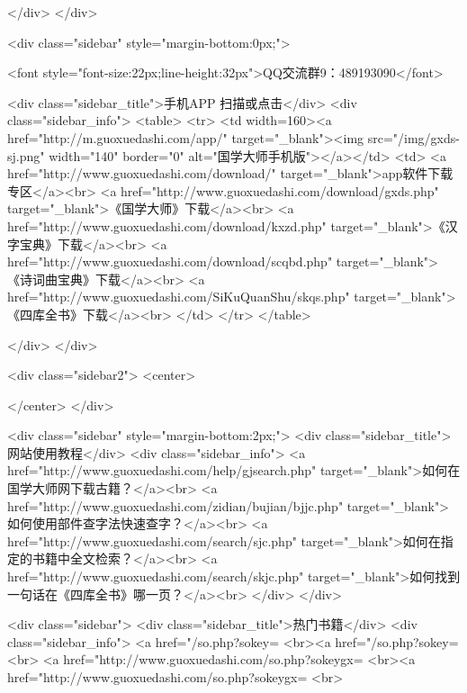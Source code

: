 </div>
</div>


<div class="sidebar" style="margin-bottom:0px;">

<font style="font-size:22px;line-height:32px">QQ交流群9：489193090</font>


<div class="sidebar_title">手机APP 扫描或点击</div>
<div class="sidebar_info">
<table>
<tr>
	<td width=160><a href="http://m.guoxuedashi.com/app/" target="_blank"><img src="/img/gxds-sj.png" width="140"  border="0" alt="国学大师手机版"></a></td>
	<td>
<a href="http://www.guoxuedashi.com/download/" target="_blank">app软件下载专区</a><br>
<a href="http://www.guoxuedashi.com/download/gxds.php" target="_blank">《国学大师》下载</a><br>
<a href="http://www.guoxuedashi.com/download/kxzd.php" target="_blank">《汉字宝典》下载</a><br>
<a href="http://www.guoxuedashi.com/download/scqbd.php" target="_blank">《诗词曲宝典》下载</a><br>
<a href="http://www.guoxuedashi.com/SiKuQuanShu/skqs.php" target="_blank">《四库全书》下载</a><br>
</td>
</tr>
</table>

</div>
</div>


<div class="sidebar2">
<center>


</center>
</div>

<div class="sidebar"  style="margin-bottom:2px;">
<div class="sidebar_title">网站使用教程</div>
<div class="sidebar_info">
<a href="http://www.guoxuedashi.com/help/gjsearch.php" target="_blank">如何在国学大师网下载古籍？</a><br>
<a href="http://www.guoxuedashi.com/zidian/bujian/bjjc.php" target="_blank">如何使用部件查字法快速查字？</a><br>
<a href="http://www.guoxuedashi.com/search/sjc.php" target="_blank">如何在指定的书籍中全文检索？</a><br>
<a href="http://www.guoxuedashi.com/search/skjc.php" target="_blank">如何找到一句话在《四库全书》哪一页？</a><br>
</div>
</div>


<div class="sidebar">
<div class="sidebar_title">热门书籍</div>
<div class="sidebar_info">
<a href="/so.php?sokey=%
<br><a href="/so.php?sokey=%
<br>
<a href="http://www.guoxuedashi.com/so.php?sokeygx=%
<br><a href="http://www.guoxuedashi.com/so.php?sokeygx=%
<br>

